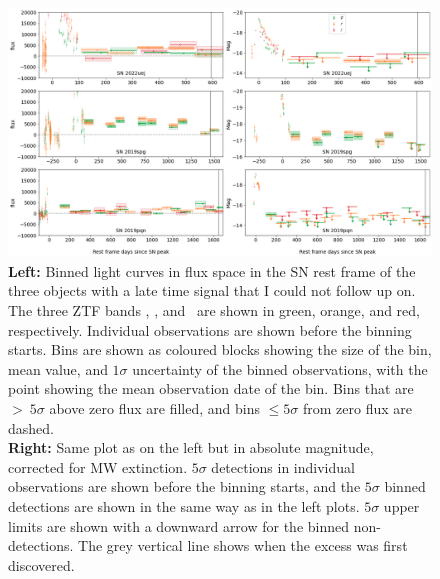 \documentclass[a4paper,oneside,12pt, class=Latex/Classes/PhDthesisPSnPDF, crop=false]{standalone}
\begin{document}
\begin{figure}
    \centering
    \includegraphics[width=\textwidth]{../Images/chapter_5/non_followup_lcs.png}
    \caption[Binned light curves of the three objects that could not be followed up on.]{\textbf{Left:} Binned light curves in flux space in the SN rest frame of the three objects with a late time signal that I could not follow up on. The three ZTF bands \ztfg, \ztfr, and \ztfi\ are shown in green, orange, and red, respectively. Individual observations are shown before the binning starts. Bins are shown as coloured blocks showing the size of the bin, mean value, and $1\sigma$ uncertainty of the binned observations, with the point showing the mean observation date of the bin. Bins that are $>\ 5\sigma$ above zero flux are filled, and bins $\leq5\sigma$ from zero flux are dashed.\\
    \textbf{Right:} Same plot as on the left but in absolute magnitude, corrected for MW extinction. $5\sigma$ detections in individual observations are shown before the binning starts, and the $5\sigma$ binned detections are shown in the same way as in the left plots. $5\sigma$ upper limits are shown with a downward arrow for the binned non-detections. The grey vertical line shows when the excess was first discovered.}
    \label{non_followup_lcs}
\end{figure}
\end{document}
